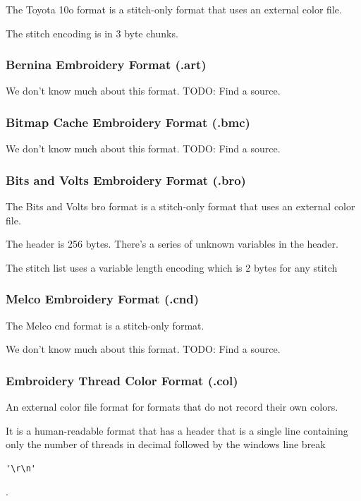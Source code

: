 \documentclass[a4paper, 11pt]{report}
\begin{document}
The Toyota 10o format is a stitch-only format that uses an external color file.

The stitch encoding is in 3 byte chunks.

\subsubsection{Bernina Embroidery Format (.art)}

We don't know much about this format. TODO: Find a source.

\subsubsection{Bitmap Cache Embroidery Format (.bmc)}

We don't know much about this format. TODO: Find a source.

\subsubsection{Bits and Volts Embroidery Format (.bro)}

The Bits and Volts bro format is a stitch-only format that uses an external color file.

The header is 256 bytes. There's a series of unknown variables in the header.

The stitch list uses a variable length encoding which is 2 bytes for any stitch

\subsubsection{Melco Embroidery Format (.cnd)}

The Melco cnd format is a stitch-only format.

We don't know much about this format. TODO: Find a source.

\subsubsection{Embroidery Thread Color Format (.col)}

An external color file format for formats that do not record their own colors. 

It is a human-readable format that has a header that is a single line containing only the number of threads in decimal followed by the windows line break \begin{verbatim}'\r\n'\end{verbatim}.
\end{document}
